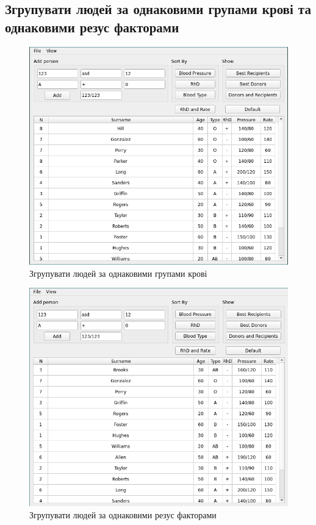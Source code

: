 \documentclass[oneside,14pt]{extarticle}
\begin{document}
\subsection{Згрупувати людей за однаковими групами крові та однаковими резус факторами}
\begin{figure}[H]
	\centering
	\includegraphics[scale=0.7]{5}
	\caption{Згрупувати людей за однаковими групами крові}
\end{figure}

\begin{figure}[H]
	\centering
	\includegraphics[scale=0.7]{6}
	\caption{Згрупувати людей за однаковими резус факторами}
\end{figure}
\end{document}
